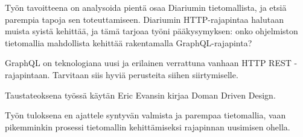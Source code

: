 Työn tavoitteena on analysoida pientä osaa Diariumin tietomallista, ja etsiä
parempia tapoja sen toteuttamiseen. Diariumin HTTP-rajapintaa halutaan muista
syistä kehittää, ja tämä tarjoaa työni pääkysymyksen: onko ohjelmiston
tietomallia mahdollista kehittää rakentamalla GraphQL-rajapinta?

GraphQL on teknologiana uusi ja erilainen verrattuna vanhaan HTTP REST
-rajapintaan. Tarvitaan siis hyviä perusteita siihen siirtymiselle.

Taustateoksena työssä käytän Eric Evansin kirjaa Doman Driven Design.

Työn tuloksena en ajattele syntyvän valmista ja parempaa tietomallia, vaan
pikemminkin prosessi tietomallin kehittämiseksi rajapinnan uusimisen ohella.